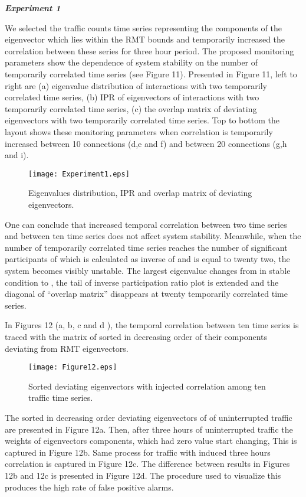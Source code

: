 \documentclass{IEEEtran}
\begin{document}
\textbf{\emph{Experiment 1}}

We selected the traffic counts time series representing the components
of the eigenvector which lies within the RMT bounds and temporarily
increased the correlation between these series for three hour period.
The proposed monitoring parameters show the dependence of system stability
on the number of temporarily correlated time series (see Figure 11).
Presented in Figure 11, left to right are (a) eigenvalue distribution
of interactions with two temporarily correlated time series, (b) IPR
of eigenvectors of interactions with two temporarily correlated time
series, (c) the overlap matrix of deviating eigenvectors with two
temporarily correlated time series. Top to bottom the layout shows
these monitoring parameters when correlation is temporarily increased
between 10 connections (d,e and f) and between 20 connections (g,h
and i). \begin{figure}[h]
\begin{center}\texttt{[image: Experiment1.eps]}\end{center}


\caption{\label{11} Eigenvalues distribution, IPR and overlap matrix of deviating
eigenvectors. }
\end{figure}
One can conclude that increased temporal correlation between two time
series and between ten time series does not affect system stability.
Meanwhile, when the number of temporarily correlated time series reaches
the number of significant participants of  which is calculated
as inverse of and is equal to twenty two, the system becomes
visibly unstable. The largest eigenvalue changes from  in stable
condition to , the tail of inverse participation ratio plot is
extended and the diagonal of {}``overlap matrix'' disappears at
twenty temporarily correlated time series.

In Figures 12 (a, b, c and d ), the temporal correlation between ten
time series is traced with the matrix of sorted in decreasing order
of their components deviating from RMT eigenvectors.\begin{figure}[h]
\begin{center}\texttt{[image: Figure12.eps]}\end{center}


\caption{\label{12} Sorted deviating eigenvectors with injected correlation
among ten traffic time series.}
\end{figure}
The sorted in decreasing order deviating eigenvectors of  of
uninterrupted traffic are presented in Figure 12a. Then, after three
hours of uninterrupted traffic the weights of eigenvectors components,
which had zero value start changing, This is captured in Figure 12b.
Same process for traffic with induced three hours correlation is captured
in Figure 12c. The difference between results in Figures 12b and 12c
is presented in Figure 12d. The procedure used to visualize this produces
the high rate of false positive alarms. 
\end{document}
